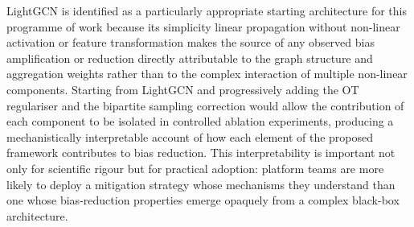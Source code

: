 \documentclass[11pt,a4paper]{report}
\begin{document}
LightGCN is identified as a particularly appropriate starting architecture for this
programme of work because its simplicity linear propagation without non-linear
activation or feature transformation makes the source of any observed bias
amplification or reduction directly attributable to the graph structure and
aggregation weights rather than to the complex interaction of multiple non-linear
components. Starting from LightGCN and progressively adding the OT regulariser and
the bipartite sampling correction would allow the contribution of each component
to be isolated in controlled ablation experiments, producing a mechanistically
interpretable account of how each element of the proposed framework contributes to
bias reduction. This interpretability is important not only for scientific rigour but
for practical adoption: platform teams are more likely to deploy a mitigation strategy
whose mechanisms they understand than one whose bias-reduction properties emerge
opaquely from a complex black-box architecture.


\renewcommand{\bibname}{References / Bibliography}
{}



\appendix

\end{document}
